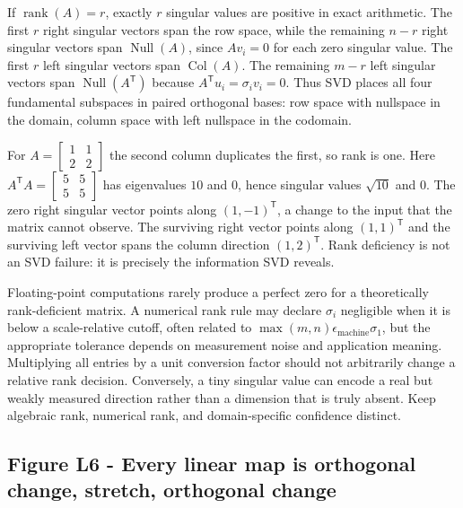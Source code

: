 If \(\operatorname{rank}(A)=r\), exactly \(r\) singular values are positive in exact arithmetic. The first \(r\) right singular vectors span the row space, while the remaining \(n-r\) right singular vectors span \(\operatorname{Null}(A)\), since \(Av_i=0\) for each zero singular value. The first \(r\) left singular vectors span \(\operatorname{Col}(A)\). The remaining \(m-r\) left singular vectors span \(\operatorname{Null}(A^\mathsf T)\) because \(A^\mathsf T u_i=\sigma_i v_i=0\). Thus SVD places all four fundamental subspaces in paired orthogonal bases: row space with nullspace in the domain, column space with left nullspace in the codomain.

For \(A=\begin{bmatrix}1&1\\2&2\end{bmatrix}\) the second column duplicates the first, so rank is one. Here \(A^\mathsf T A=\begin{bmatrix}5&5\\5&5\end{bmatrix}\) has eigenvalues \(10\) and \(0\), hence singular values \(\sqrt{10}\) and \(0\). The zero right singular vector points along \((1,-1)^\mathsf T\), a change to the input that the matrix cannot observe. The surviving right vector points along \((1,1)^\mathsf T\) and the surviving left vector spans the column direction \((1,2)^\mathsf T\). Rank deficiency is not an SVD failure: it is precisely the information SVD reveals.

Floating-point computations rarely produce a perfect zero for a theoretically rank-deficient matrix. A numerical rank rule may declare \(\sigma_i\) negligible when it is below a scale-relative cutoff, often related to \(\max(m,n)\epsilon_{\mathrm{machine}}\sigma_1\), but the appropriate tolerance depends on measurement noise and application meaning. Multiplying all entries by a unit conversion factor should not arbitrarily change a relative rank decision. Conversely, a tiny singular value can encode a real but weakly measured direction rather than a dimension that is truly absent. Keep algebraic rank, numerical rank, and domain-specific confidence distinct.

\subsection{Figure L6 - Every linear map is orthogonal change, stretch, orthogonal change}\label{02-foundations-ii-ch024-figure-l6---every-linear-map-is-orthogonal-change-stretch-orthogonal-change}


